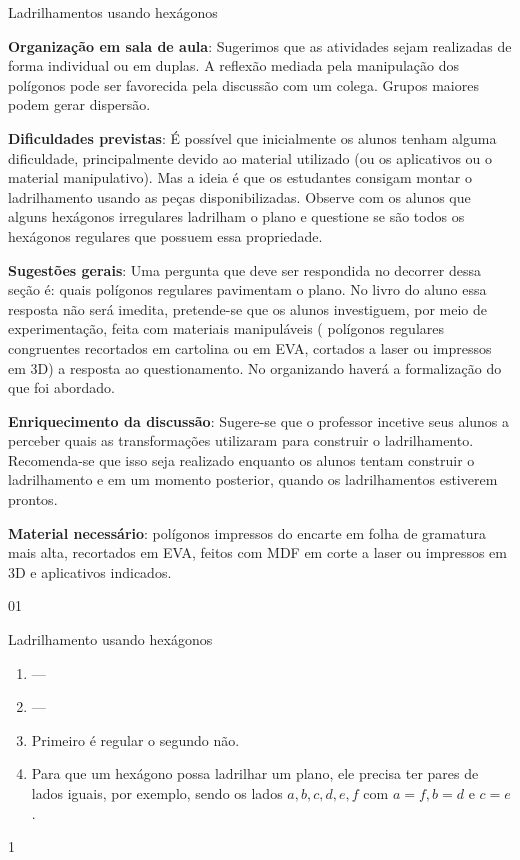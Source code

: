 \begin{sugestions}{Ladrilhamentos usando hexágonos}
{
	\textbf{Organização em sala de aula}: Sugerimos que as atividades sejam realizadas de forma individual ou em duplas. A reflexão mediada pela manipulação dos polígonos pode ser favorecida pela discussão com um colega. Grupos maiores podem gerar dispersão.

	\textbf{Dificuldades previstas}: É possível que inicialmente os alunos tenham alguma dificuldade, principalmente devido ao material utilizado (ou os aplicativos ou o material manipulativo). Mas a ideia é que os estudantes consigam montar o ladrilhamento usando as peças disponibilizadas. Observe com os alunos que alguns hexágonos irregulares ladrilham o plano e questione se são todos os hexágonos regulares que possuem essa propriedade.

	\textbf{Sugestões gerais}: Uma pergunta que deve ser respondida no decorrer dessa seção é: quais polígonos regulares pavimentam o plano. No livro do aluno essa resposta não será imedita, pretende-se que os alunos investiguem, por meio de experimentação, feita com materiais manipuláveis ( polígonos regulares congruentes recortados em cartolina ou em EVA, cortados a laser ou impressos em 3D) a resposta ao questionamento. No organizando haverá a formalização do que foi abordado.  

	\textbf{Enriquecimento da discussão}: Sugere-se que o professor incetive seus alunos a perceber quais as transformações utilizaram para construir o ladrilhamento. Recomenda-se que isso seja realizado enquanto os alunos tentam construir o ladrilhamento e em um momento posterior, quando os ladrilhamentos estiverem prontos.

	\textbf{Material necessário}: polígonos impressos do encarte em folha de gramatura mais alta, recortados em EVA, feitos com MDF em corte a laser ou impressos em 3D e aplicativos indicados.

}{0}{1}
\end{sugestions}
\marginpar{\vspace{.5\baselineskip}}
\begin{answer}{Ladrilhamento usando hexágonos}
{
	\begin{enumerate}
	\item ---
	\item ---
	\item Primeiro é regular o segundo não.
	\item Para que um hexágono possa ladrilhar um plano, ele precisa ter pares de lados iguais, por exemplo, sendo os lados $a,b,c,d,e,f$ com $a=f,b=d$ e $c=e$.
	\end{enumerate}
}{1}
\end{answer}
